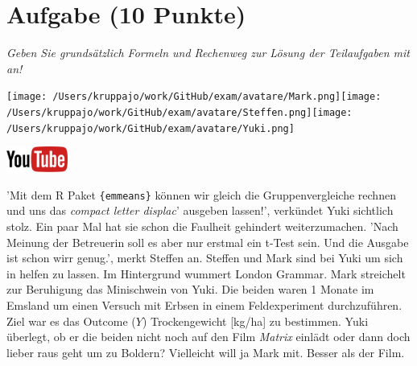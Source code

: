 \documentclass[a4paper, 9pt]{scrartcl}\usepackage[]{graphicx}\usepackage[]{xcolor}
\begin{document}
 
\clearpage

\section{Aufgabe \hfill (10 Punkte)}

\textit{Geben Sie grundsätzlich Formeln und Rechenweg zur Lösung der Teilaufgaben mit an!} \\[1Ex]
 

 
\begin{minipage}[t]{0.5\textwidth}
\texttt{[image: /Users/kruppajo/work/GitHub/exam/avatare/Mark.png]}\hspace{-4mm}\texttt{[image: /Users/kruppajo/work/GitHub/exam/avatare/Steffen.png]}\hspace{-4mm}\texttt{[image: /Users/kruppajo/work/GitHub/exam/avatare/Yuki.png]}
\end{minipage}
\begin{minipage}[t]{0.5\textwidth}
\hfill
\href{https://youtu.be/exDo7AyHl4Q}{\includegraphics[width = 2cm]{img/youtube}}
\end{minipage}
\vspace{1ex}



'Mit dem R Paket \texttt{\{emmeans\}} können wir gleich die Gruppenvergleiche rechnen und uns das \textit{compact letter displac}' ausgeben lassen!', verkündet Yuki sichtlich stolz. Ein paar Mal hat sie schon die Faulheit gehindert weiterzumachen. 'Nach Meinung der Betreuerin soll es aber nur erstmal ein t-Test sein. Und die Ausgabe ist schon wirr genug.', merkt Steffen an. Steffen und Mark sind bei Yuki um sich in \Rlogo helfen zu lassen. Im Hintergrund wummert London Grammar. Mark streichelt zur Beruhigung das Minischwein von Yuki. Die beiden waren 1 Monate im Emsland um einen Versuch mit Erbsen in einem Feldexperiment durchzuführen. Ziel war es das Outcome ($Y$) Trockengewicht [kg/ha] zu bestimmen. Yuki überlegt, ob er die beiden nicht noch auf den Film \textit{Matrix} einlädt oder dann doch lieber raus geht um zu Boldern? Vielleicht will ja Mark mit. Besser als der Film.
\end{document}
